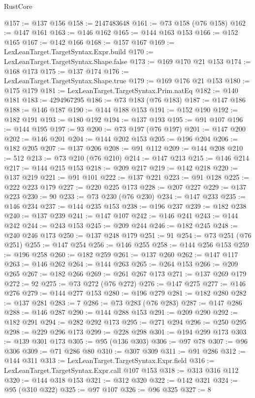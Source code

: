 \begin{lexlean}{RustCore}
\begin{coremodule}
@157 := @137 @156
@158 := 2147483648
@161 := @73 @158 (@76 @158)
@162 := @147 @161
@163 := @146 @162
@165 := @144 @163 @153
@166 := @152 @165
@167 := @142 @166
@168 := @157 @167
@169 := LexLeanTarget.TargetSyntax.Expr.build
@170 := LexLeanTarget.TargetSyntax.Shape.false
@173 := @169 @170 @21 @153
@174 := @168 @173
@175 := @137 @174
@176 := LexLeanTarget.TargetSyntax.Shape.true
@179 := @169 @176 @21 @153
@180 := @175 @179
@181 := LexLeanTarget.TargetSyntax.Prim.natEq
@182 := @140 @181
@183 := 4294967295
@186 := @73 @183 (@76 @183)
@187 := @147 @186
@188 := @146 @187
@190 := @144 @188 @153
@191 := @152 @190
@192 := @182 @191
@193 := @180 @192
@194 := @137 @193
@195 := @91 @107
@196 := @144 @195
@197 := 93
@200 := @73 @197 (@76 @197)
@201 := @147 @200
@202 := @146 @201
@204 := @144 @202 @153
@205 := @196 @204
@206 := @182 @205
@207 := @137 @206
@208 := @91 @112
@209 := @144 @208
@210 := 512
@213 := @73 @210 (@76 @210)
@214 := @147 @213
@215 := @146 @214
@217 := @144 @215 @153
@218 := @209 @217
@219 := @142 @218
@220 := @137 @219
@221 := @91 @101
@222 := @137 @221
@223 := @91 @128
@225 := @222 @223 @179
@227 := @220 @225 @173
@228 := @207 @227
@229 := @137 @223
@230 := 90
@233 := @73 @230 (@76 @230)
@234 := @147 @233
@235 := @146 @234
@237 := @144 @235 @153
@238 := @196 @237
@239 := @182 @238
@240 := @137 @239
@241 := @147 @107
@242 := @146 @241
@243 := @144 @242
@244 := @243 @153
@245 := @209 @244
@246 := @182 @245
@248 := @240 @246 @173
@250 := @137 @248 @179
@251 := 91
@254 := @73 @251 (@76 @251)
@255 := @147 @254
@256 := @146 @255
@258 := @144 @256 @153
@259 := @196 @258
@260 := @182 @259
@261 := @137 @260
@262 := @147 @117
@263 := @146 @262
@264 := @144 @263
@265 := @264 @153
@266 := @209 @265
@267 := @182 @266
@269 := @261 @267 @173
@271 := @137 @269 @179
@272 := 92
@275 := @73 @272 (@76 @272)
@276 := @147 @275
@277 := @146 @276
@279 := @144 @277 @153
@280 := @196 @279
@281 := @182 @280
@282 := @137 @281
@283 := 7
@286 := @73 @283 (@76 @283)
@287 := @147 @286
@288 := @146 @287
@290 := @144 @288 @153
@291 := @209 @290
@292 := @182 @291
@294 := @282 @292 @173
@295 := @271 @294
@296 := @250 @295
@298 := @229 @296 @173
@299 := @228 @298
@301 := @194 @299 @173
@303 := @139 @301 @173
@305 := @95 (@136 @303)
@306 := @97 @78
@307 := @96 @306
@309 := @71 @286 @80
@310 := @307 @309
@311 := @91 @286
@312 := @144 @311
@313 := LexLeanTarget.TargetSyntax.Expr.field
@316 := LexLeanTarget.TargetSyntax.Expr.call @107 @153
@318 := @313 @316 @112
@320 := @144 @318 @153
@321 := @312 @320
@322 := @142 @321
@324 := @95 (@310 @322)
@325 := @97 @107
@326 := @96 @325
@327 := 8

\end{coremodule}
\end{lexlean}
